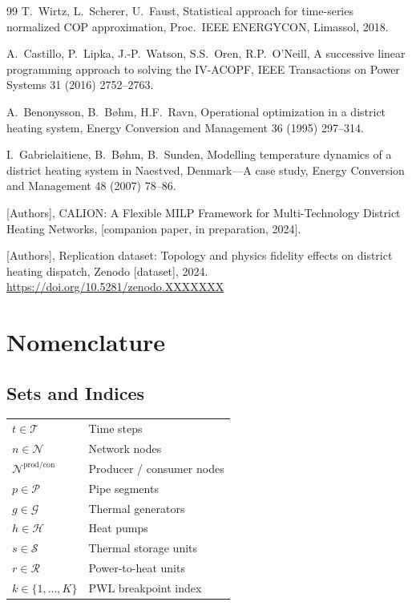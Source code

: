 \documentclass[review,3p]{elsarticle}
\begin{document}
\begin{thebibliography}{99}
T.\ Wirtz, L.\ Scherer, U.\ Faust,
Statistical approach for time-series normalized COP approximation,
Proc.\ IEEE ENERGYCON, Limassol, 2018.

A.\ Castillo, P.\ Lipka, J.-P.\ Watson, S.S.\ Oren,
R.P.\ O'Neill,
A successive linear programming approach to solving the
IV-ACOPF,
IEEE Transactions on Power Systems 31 (2016) 2752--2763.

A.\ Benonysson, B.\ Bøhm, H.F.\ Ravn,
Operational optimization in a district heating system,
Energy Conversion and Management 36 (1995) 297--314.

I.\ Gabrielaitiene, B.\ Bøhm, B.\ Sunden,
Modelling temperature dynamics of a district heating system in
Naestved, Denmark---A case study,
Energy Conversion and Management 48 (2007) 78--86.

[Authors], CALION: A Flexible MILP Framework for Multi-Technology
District Heating Networks, [companion paper, in preparation, 2024].

[Authors], Replication dataset: Topology and physics fidelity
effects on district heating dispatch, Zenodo [dataset], 2024.
\url{https://doi.org/10.5281/zenodo.XXXXXXX}

\end{thebibliography}

\appendix

\section{Nomenclature}
\label{app:nomenclature}

\subsection*{Sets and Indices}
\begin{tabular}{@{}p{2.8cm}p{9.5cm}@{}}
$t \in \mathcal{T}$               & Time steps \\
$n \in \mathcal{N}$               & Network nodes \\
$\mathcal{N}^{\mathrm{prod/con}}$ & Producer / consumer nodes \\
$p \in \mathcal{P}$               & Pipe segments \\
$g \in \mathcal{G}$               & Thermal generators \\
$h \in \mathcal{H}$               & Heat pumps \\
$s \in \mathcal{S}$               & Thermal storage units \\
$r \in \mathcal{R}$               & Power-to-heat units \\
$k \in \{1,\ldots,K\}$           & PWL breakpoint index \\
\end{tabular}
\end{document}
